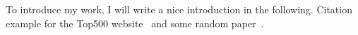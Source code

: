\label{chapter:introduction}

To introduce my work, I will write a nice introduction in the following.
Citation example for the Top500 website~\cite{top500} and some random paper~\cite{graham1969}.

\lipsum[1]
